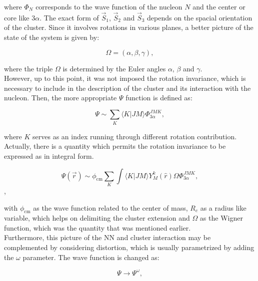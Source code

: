 \documentclass[openany]{book}
\begin{document}
where $\Phi_N$ corresponds to the wave function of the nucleon $N$ and the center or core like $3\alpha$. The exact form of $\vec S_1$, $\vec S_2$ and $\vec S_3$ depends on the spacial orientation of the cluster. Since it involves rotations in various planes, a better picture of the state of the system is given by:

\begin{equation} 	\label{eq:micro_multicluster_eulerAlgles}
	\Omega = (\alpha, \beta, \gamma),
\end{equation}

where the triple $\Omega$ is determined by the Euler angles $\alpha$, $\beta$ and $\gamma$. \\

However, up to this point, it was not imposed the rotation invariance, which is necessary to include in the description of the cluster and its interaction with the nucleon. Then, the more appropriate $\Psi$ function is defined as: 

 \begin{equation} 	\label{eq:micro_multicluster_psi}
 	\Psi \sim \sum_{K} \langle K | JM \rangle \Phi^{JMK}_{3\alpha},
 \end{equation}

where $K$ serves as an index running through different rotation contribution. Actually, there is a quantity which permits the rotation invariance to be expressed as in integral form. 

 \begin{equation} 	\label{eq:micro_multicluster_psi_integral}
	\Psi(\vec r) \sim \phi_{\mathrm{cm}} \sum_{K}  \int \langle K | JM \rangle  Y^{k}_{M}(\hat r )  \mathcal{\Omega} \Phi^{JMK}_{3\alpha},
\end{equation}, 

with $\phi_{\mathrm{cm}} $ as the wave function related to the center of mass, $R_c$ as a radius like variable, which helps on delimiting the cluster extension and $\mathcal{\Omega}$ as the Wigner function, which was the quantity that was mentioned earlier. \\

Furthermore, this picture of the NN and cluster interaction may be complemented by considering distortion, which is usually parametrized by adding the $\omega$ parameter. The wave function is changed as: 

\begin{equation} 	\label{eq:micro_multicluster_distortion}
	\Psi \rightarrow \Psi^{\omega},
\end{equation}
\end{document}

